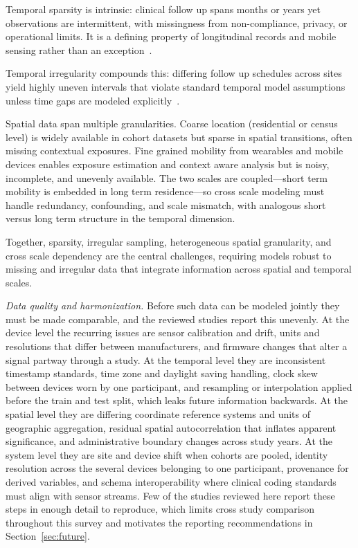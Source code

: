 \documentclass[journal]{IEEEtran}
\begin{document}
Temporal sparsity is intrinsic: clinical follow up spans months or years yet observations are intermittent, with missingness from non-compliance, privacy, or operational limits. It is a defining property of longitudinal records and mobile sensing rather than an exception~\cite{che2018grud}.

Temporal irregularity compounds this: differing follow up schedules across sites yield highly uneven intervals that violate standard temporal model assumptions unless time gaps are modeled explicitly~\cite{shukla2021irregular}.

Spatial data span multiple granularities. Coarse location (residential or census level) is widely available in cohort datasets but sparse in spatial transitions, often missing contextual exposures. Fine grained mobility from wearables and mobile devices enables exposure estimation and context aware analysis but is noisy, incomplete, and unevenly available. The two scales are coupled---short term mobility is embedded in long term residence---so cross scale modeling must handle redundancy, confounding, and scale mismatch, with analogous short versus long term structure in the temporal dimension.

Together, sparsity, irregular sampling, heterogeneous spatial granularity, and cross scale dependency are the central challenges, requiring models robust to missing and irregular data that integrate information across spatial and temporal scales.

\emph{Data quality and harmonization.} Before such data can be modeled jointly they must be made comparable, and the reviewed studies report this unevenly. At the device level the recurring issues are sensor calibration and drift, units and resolutions that differ between manufacturers, and firmware changes that alter a signal partway through a study. At the temporal level they are inconsistent timestamp standards, time zone and daylight saving handling, clock skew between devices worn by one participant, and resampling or interpolation applied before the train and test split, which leaks future information backwards. At the spatial level they are differing coordinate reference systems and units of geographic aggregation, residual spatial autocorrelation that inflates apparent significance, and administrative boundary changes across study years. At the system level they are site and device shift when cohorts are pooled, identity resolution across the several devices belonging to one participant, provenance for derived variables, and schema interoperability where clinical coding standards must align with sensor streams. Few of the studies reviewed here report these steps in enough detail to reproduce, which limits cross study comparison throughout this survey and motivates the reporting recommendations in Section~\ref{sec:future}.
\end{document}
